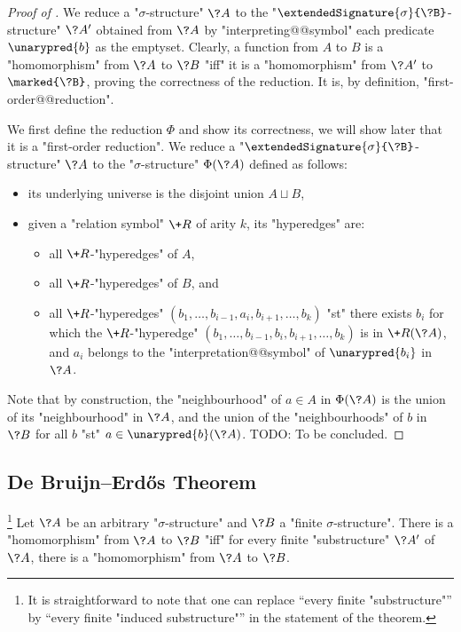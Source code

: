 \begin{proof}[Proof of ]
We reduce a "$\sigma$-structure" $\?A$ to the
"$\extendedSignature{\sigma}{\?B}$-structure" $\?A'$ obtained
from $\?A$ by "interpreting@@symbol" each predicate $\unarypred{b}$ as the emptyset.
Clearly, a function from $A$ to $B$ is a "homomorphism" from $\?A$ to $\?B$
"iff" it is a "homomorphism" from $\?A'$ to $\marked{\?B}$, proving the correctness
of the reduction. It is, by definition, "first-order@@reduction".

We first define the reduction $\Phi$ and show its correctness, we will show later that it
is a "first-order reduction". We reduce a "$\extendedSignature{\sigma}{\?B}$-structure" $\?A$ to the "$\sigma$-structure"
$\Phi(\?A)$ defined as follows:
\begin{itemize}
	\item its underlying universe is the disjoint union $A \sqcup B$,
	\item given a "relation symbol" $\+R$ of arity $k$, its "hyperedges" are:
	\begin{itemize}
	\item all $\+R$-"hyperedges" of $A$,
	\item all $\+R$-"hyperedges" of $B$, and
	\item all $\+R$-"hyperedges" $(b_1,\hdots,b_{i-1}, a_i, b_{i+1},\hdots,b_k)$
		"st" there exists $b_i$ for which the $\+R$-"hyperedge"
		$(b_1,\hdots,b_{i-1}, b_i, b_{i+1},\hdots,b_k)$
		is in $\+R(\?A)$, and $a_i$ belongs to the "interpretation@@symbol" of 
		$\unarypred{b_i}$ in $\?A$.
	\end{itemize}
\end{itemize}
Note that by construction, the "neighbourhood" of $a \in A$ in $\Phi(\?A)$ is
the union of its "neighbourhood" in $\?A$, and the union of the "neighbourhoods" of
$b$ in $\?B$ for all $b$ "st" $a \in \unarypred{b}(\?A)$.
TODO: To be concluded.  
\end{proof}

\subsection{De Bruijn–Erdős Theorem}

\begin{proposition}
	\!\footnote{It is straightforward to note that
	one can replace ``every finite "substructure"'' by
	``every finite "induced substructure"'' in the statement of the theorem.}%
	\AP\label{prop:de-bruijn-erdos}
	Let $\?A$ be an arbitrary "$\sigma$-structure" and $\?B$ a "finite $\sigma$-structure".
	There is a "homomorphism" from $\?A$ to $\?B$ "iff" for every finite "substructure" $\?A'$
	of $\?A$, there is a "homomorphism" from $\?A$ to $\?B$.
\end{proposition}

